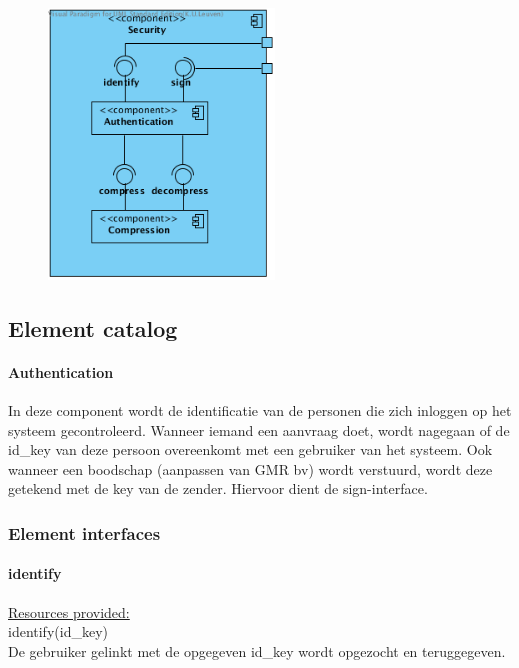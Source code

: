 \documentclass[a4paper,10pt]{article}
\begin{document}
\begin{center}
    \begin{figure}[!h]
      \includegraphics[width=60mm]{../images/ClientServer_Security.png}
    \end{figure}
  \end{center}

\subsection{Element catalog}

\paragraph{Authentication}
In deze component wordt de identificatie van de personen die zich inloggen op het systeem gecontroleerd. Wanneer iemand een aanvraag doet, wordt nagegaan of de id\_key van deze persoon overeenkomt met een gebruiker van het systeem. Ook wanneer een boodschap (aanpassen van GMR bv) wordt verstuurd, wordt deze getekend met de key van de zender. Hiervoor dient de sign-interface.  

\subsubsection{Element interfaces}
\paragraph{identify}

\underline{Resources provided:}\\
identify(id\_key)\\
De gebruiker gelinkt met de opgegeven id\_key wordt opgezocht en teruggegeven.\\
\end{document}
